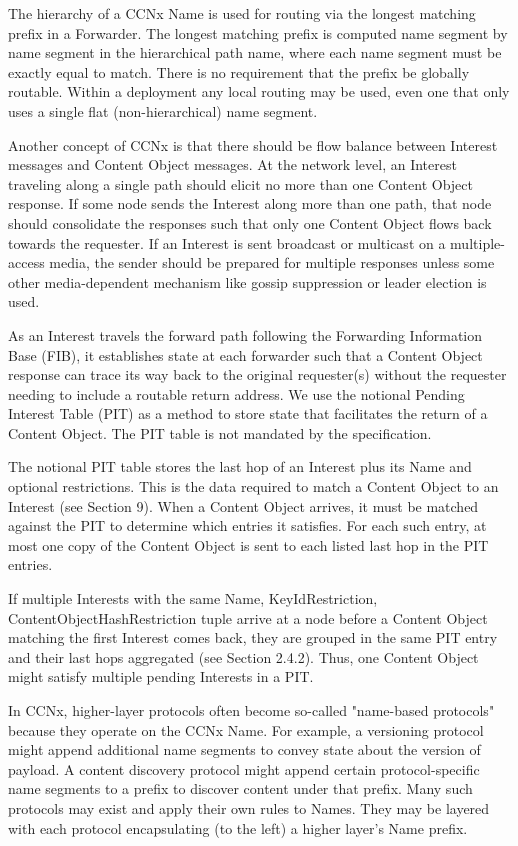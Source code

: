 \documentclass[12pt]{report}
\begin{document}
The hierarchy of a CCNx Name is used for routing via the longest
matching prefix in a Forwarder.  The longest matching prefix is
computed name segment by name segment in the hierarchical path name,
where each name segment must be exactly equal to match.  There is no
requirement that the prefix be globally routable.  Within a
deployment any local routing may be used, even one that only uses a
single flat (non-hierarchical) name segment.

Another concept of CCNx is that there should be flow balance between
Interest messages and Content Object messages.  At the network level,
an Interest traveling along a single path should elicit no more than
one Content Object response.  If some node sends the Interest along
more than one path, that node should consolidate the responses such
that only one Content Object flows back towards the requester.  If an
Interest is sent broadcast or multicast on a multiple-access media,
the sender should be prepared for multiple responses unless some
other media-dependent mechanism like gossip suppression or leader
election is used.

As an Interest travels the forward path following the Forwarding
Information Base (FIB), it establishes state at each forwarder such
that a Content Object response can trace its way back to the original
requester(s) without the requester needing to include a routable
return address.  We use the notional Pending Interest Table (PIT) as
a method to store state that facilitates the return of a Content
Object.  The PIT table is not mandated by the specification.

The notional PIT table stores the last hop of an Interest plus its
Name and optional restrictions.  This is the data required to match a
Content Object to an Interest (see Section 9).  When a Content Object
arrives, it must be matched against the PIT to determine which
entries it satisfies.  For each such entry, at most one copy of the
Content Object is sent to each listed last hop in the PIT entries.

If multiple Interests with the same {Name, KeyIdRestriction,
ContentObjectHashRestriction} tuple arrive at a node before a Content
Object matching the first Interest comes back, they are grouped in
the same PIT entry and their last hops aggregated (see
Section 2.4.2).  Thus, one Content Object might satisfy multiple
pending Interests in a PIT.

In CCNx, higher-layer protocols often become so-called "name-based
protocols" because they operate on the CCNx Name.  For example, a
versioning protocol might append additional name segments to convey
state about the version of payload.  A content discovery protocol
might append certain protocol-specific name segments to a prefix to
discover content under that prefix.  Many such protocols may exist
and apply their own rules to Names.  They may be layered with each
protocol encapsulating (to the left) a higher layer's Name prefix.
\end{document}
